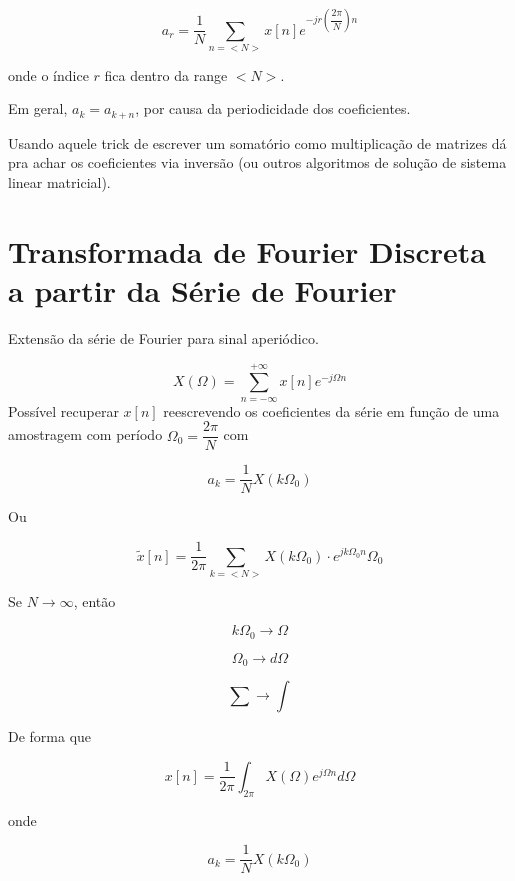 \[a_{r} = \dfrac{1}{N} \sum^{}_{n = <N>}x[n]e^{-jr(\dfrac{2 \pi}{N})n}\]

onde o índice $r$ fica dentro da range $<N>$.

Em geral, $a_k = a_{k + n}$, por causa da periodicidade dos coeficientes.

Usando aquele trick de escrever um somatório como multiplicação de matrizes dá pra achar os coeficientes via inversão (ou outros algoritmos de solução de sistema linear matricial).

\section{Transformada de Fourier Discreta a partir da Série de Fourier}

Extensão da série de Fourier para sinal aperiódico.

\begin{equation} 
    X(\Omega) = \sum^{+\infty}_{n = -\infty}x[n]e^{-j\Omega n}
\end{equation}
Possível recuperar $x[n]$ reescrevendo os coeficientes da série em função de uma amostragem com período $\Omega_{0} = \dfrac{2\pi}{N}$ com

\[a_{k} = \dfrac{1}{N} X(k\Omega_{0})\]

Ou

\[\tilde{x}[n] = \dfrac{1}{2\pi} \sum^{}_{k = <N>}X(k\Omega_{0}) \cdot e^{jk\Omega_{0}n}\Omega_{0}\]


Se $N \rightarrow \infty$, então

\[k\Omega_{0} \rightarrow \Omega\]

\[\Omega_{0} \rightarrow d\Omega\]

\[\sum \rightarrow \int\]

De forma que

\begin{equation} 
    x[n] = \frac{1}{2\pi}\int^{}_{2 \pi}X(\Omega)e^{j\Omega n}d\Omega
\end{equation}

onde

\begin{equation} 
    a_{k} = \dfrac{1}{N}X(k\Omega_{0})
\end{equation}